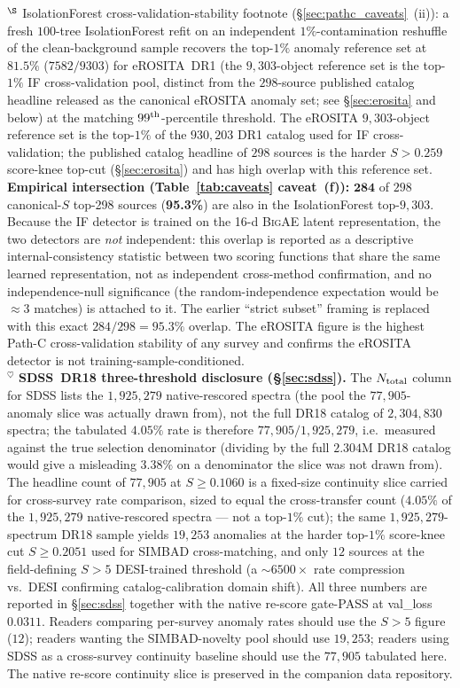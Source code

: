 \documentclass[aps,prd,twocolumn,superscriptaddress,showpacs,preprintnumbers,nofootinbib,longbibliography,floatfix]{revtex4-2}
\newcommand{\BigAE}{\textsc{BigAE}}
\begin{document}
{$^\S$ IsolationForest cross-validation-stability footnote (\S\ref{sec:pathc_caveats}~(ii)): a fresh $100$-tree IsolationForest refit on an independent $1\%$-contamination reshuffle of the clean-background sample recovers the top-$1\%$ anomaly reference set at $81.5\%$ ($7582/9303$) for eROSITA~DR1 (the $9{,}303$-object reference set is the top-$1\%$ IF cross-validation pool, distinct from the $298$-source published catalog headline released as the canonical eROSITA anomaly set; see \S\ref{sec:erosita} and below) at the matching $99^{\rm th}$-percentile threshold. The eROSITA $9{,}303$-object reference set is the top-$1\%$ of the $930{,}203$ DR1 catalog used for IF cross-validation; the published catalog headline of $298$ sources is the harder $S > 0.259$ score-knee top-cut (\S\ref{sec:erosita}) and has high overlap with this reference set. \textbf{Empirical intersection (Table~\ref{tab:caveats} caveat~(f)):} $\mathbf{284}$ of $298$ canonical-$S$ top-298 sources (\textbf{95.3\%}) are also in the IsolationForest top-$9{,}303$. Because the IF detector is trained on the 16-d \BigAE{} latent representation, the two detectors are \emph{not} independent: this overlap is reported as a descriptive internal-consistency statistic between two scoring functions that share the same learned representation, not as independent cross-method confirmation, and no independence-null significance (the random-independence expectation would be $\approx\!3$ matches) is attached to it. The earlier ``strict subset'' framing is replaced with this exact $284/298 = 95.3\%$ overlap. The eROSITA figure is the highest Path-C cross-validation stability of any survey and confirms the eROSITA detector is not training-sample-conditioned.\\
$^{\heartsuit}$ \textbf{SDSS~DR18 three-threshold disclosure (\S\ref{sec:sdss}).} The $N_{\rm total}$ column for SDSS lists the $1{,}925{,}279$ native-rescored spectra (the pool the $77{,}905$-anomaly slice was actually drawn from), not the full DR18 catalog of $2{,}304{,}830$ spectra; the tabulated $4.05\%$ rate is therefore $77{,}905/1{,}925{,}279$, i.e.\ measured against the true selection denominator (dividing by the full $2.304$M DR18 catalog would give a misleading $3.38\%$ on a denominator the slice was not drawn from). The headline count of $77{,}905$ at $S \geq 0.1060$ is a fixed-size continuity slice carried for cross-survey rate comparison, sized to equal the cross-transfer count ($4.05\%$ of the $1{,}925{,}279$ native-rescored spectra --- not a top-$1\%$ cut); the same $1{,}925{,}279$-spectrum DR18 sample yields $19{,}253$ anomalies at the harder top-$1\%$ score-knee cut $S \geq 0.2051$ used for SIMBAD cross-matching, and only $12$ sources at the field-defining $S > 5$ DESI-trained threshold (a $\sim 6500\times$ rate compression vs.\ DESI confirming catalog-calibration domain shift). All three numbers are reported in \S\ref{sec:sdss} together with the native re-score gate-PASS at val\_loss $0.0311$. Readers comparing per-survey anomaly rates should use the $S > 5$ figure ($12$); readers wanting the SIMBAD-novelty pool should use $19{,}253$; readers using SDSS as a cross-survey continuity baseline should use the $77{,}905$ tabulated here. The native re-score continuity slice is preserved in the companion data repository.\\
}
\end{document}

